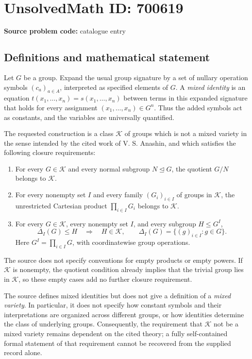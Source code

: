 \documentclass[11pt]{article}
\begin{document}
\section*{UnsolvedMath ID: 700619}
\textbf{Source problem code:} catalogue entry
\subsection{Definitions and mathematical statement}
Let \(G\) be a group. Expand the usual group signature by a set of nullary operation symbols \((c_a)_{a\in A}\), interpreted as specified elements of \(G\). A \emph{mixed identity} is an equation \(t(x_1,\ldots,x_n)=s(x_1,\ldots,x_n)\) between terms in this expanded signature that holds for every assignment \((x_1,\ldots,x_n)\in G^n\). Thus the added symbols act as constants, and the variables are universally quantified.

The requested construction is a class \(\mathcal K\) of groups which is not a mixed variety in the sense intended by the cited work of V. S. Anashin, and which satisfies the following closure requirements:
\begin{enumerate}
\item For every \(G\in\mathcal K\) and every normal subgroup \(N\trianglelefteq G\), the quotient \(G/N\) belongs to \(\mathcal K\).
\item For every nonempty set \(I\) and every family \((G_i)_{i\in I}\) of groups in \(\mathcal K\), the unrestricted Cartesian product \(\prod_{i\in I}G_i\) belongs to \(\mathcal K\).
\item For every \(G\in\mathcal K\), every nonempty set \(I\), and every subgroup \(H\leq G^I\),
\[
\Delta_I(G)\leq H\quad\Longrightarrow\quad H\in\mathcal K,
\qquad
\Delta_I(G)=\{(g)_{i\in I}:g\in G\}.
\]
Here \(G^I=\prod_{i\in I}G\), with coordinatewise group operations.
\end{enumerate}
The source does not specify conventions for empty products or empty powers. If \(\mathcal K\) is nonempty, the quotient condition already implies that the trivial group lies in \(\mathcal K\), so these empty cases add no further closure requirement.

The source defines mixed identities but does not give a definition of a \emph{mixed variety}. In particular, it does not specify how constant symbols and their interpretations are organized across different groups, or how identities determine the class of underlying groups. Consequently, the requirement that \(\mathcal K\) not be a mixed variety remains dependent on the cited theory; a fully self-contained formal statement of that requirement cannot be recovered from the supplied record alone.
\end{document}
